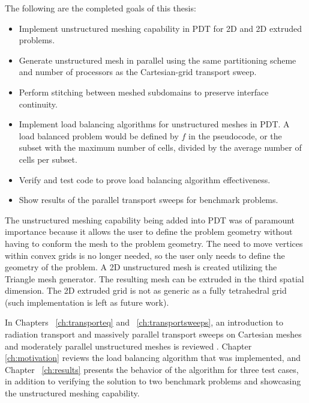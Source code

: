 The following are the completed goals of this thesis:
\begin{itemize}
\item Implement unstructured meshing capability in PDT for 2D and 2D extruded problems.
\item Generate unstructured mesh in parallel using the same partitioning scheme and number of processors as the Cartesian-grid transport sweep.
\item {Perform stitching between meshed subdomains to preserve interface continuity.}
\item Implement load balancing algorithms for unstructured meshes in PDT. A load balanced problem would be defined by $f$ in the pseudocode, or the subset with the maximum number of cells, divided by the average number of cells per subset.
\item Verify and test code to prove load balancing algorithm effectiveness. 
\item Show results  of the parallel transport sweeps for benchmark problems.
\end{itemize}

The unstructured meshing capability being added into PDT was of paramount importance because it allows the user to define the problem geometry without having to conform the mesh to the problem geometry. The need to move vertices within convex grids is no longer needed, so the user only needs to define the geometry of the problem. A 2D unstructured mesh is created utilizing the Triangle mesh generator. The resulting mesh can be extruded in the third spatial dimension. The 2D extruded grid is not as generic as a fully tetrahedral grid (such implementation is left as future work). 

In Chapters ~\ref{ch:transporteq} and ~\ref{ch:transportsweeps}, an introduction to radiation transport and massively parallel transport sweeps on Cartesian meshes and moderately parallel unstructured meshes is reviewed . Chapter \ref{ch:motivation} reviews  the load balancing algorithm that was implemented, and Chapter ~\ref{ch:results} presents the behavior of the algorithm for three test cases, in addition to verifying the solution to two benchmark problems and showcasing the unstructured meshing capability. 

